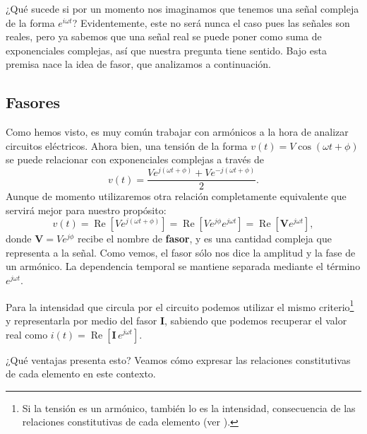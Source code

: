 ¿Qué sucede si por un momento nos imaginamos que tenemos una señal compleja de la forma $e^{i\omega t}$? Evidentemente, este no será nunca el caso pues las señales son reales, pero ya sabemos que una señal real se puede poner como suma de exponenciales complejas, así que nuestra pregunta tiene sentido. Bajo esta premisa nace la idea de fasor, que analizamos a continuación.

\subsection{Fasores}
Como hemos visto, es muy común trabajar con armónicos a la hora de analizar circuitos eléctricos. Ahora bien, una tensión de la forma $v(t) = V \cos(\omega t + \phi)$ se puede relacionar con exponenciales complejas a través de
\[
v(t) = \frac{Ve^{j(\omega t + \phi)} + Ve^{-j(\omega t + \phi)}}{2}.
\]
Aunque de momento utilizaremos otra relación completamente equivalente que servirá mejor para nuestro propósito:
\[
v(t) = \operatorname{Re} \left[V e^{j(\omega t + \phi)}\right] = \operatorname{Re} \left [V e^{j\phi} e^{j\omega t}\right] = \operatorname{Re} \left[\mathbf{V} e^{j\omega t}\right],
\]
donde $\mathbf{V} = V e^{j\phi}$ recibe el nombre de \textbf{fasor}, y es una cantidad compleja que representa a la señal. Como vemos, el fasor sólo nos dice la amplitud y la fase de un armónico. La dependencia temporal se mantiene separada mediante el término $e^{j\omega t}$.

Para la intensidad que circula por el circuito podemos utilizar el mismo criterio\footnote{Si la tensión es un armónico, también lo es la intensidad, consecuencia de las relaciones constitutivas de cada elemento (ver \cite{FasorIntensidad}).} y representarla por medio del fasor $\mathbf{I}$, sabiendo que podemos recuperar el valor real como $i(t)=\operatorname{Re}\left[\mathbf{I}\,e^{j\omega t}\right]$.

¿Qué ventajas presenta esto? Veamos cómo expresar las relaciones constitutivas de cada elemento en este contexto.


